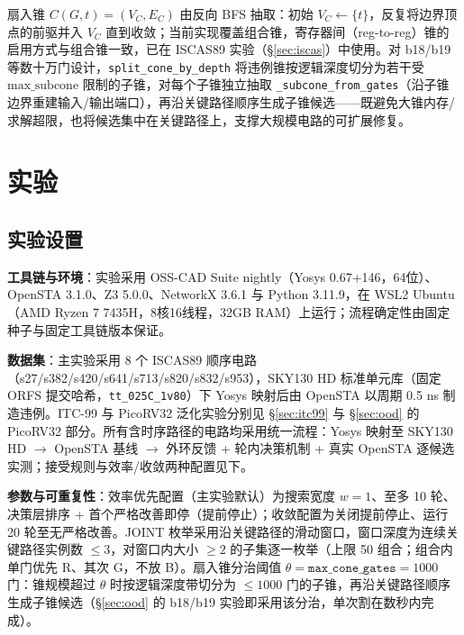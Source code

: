 \documentclass[journal]{IEEEtran}
\begin{document}
扇入锥 $C(G, t) = (V_C, E_C)$ 由反向 BFS 抽取：初始 $V_C \leftarrow \{t\}$，反复将边界顶点的前驱并入 $V_C$ 直到收敛；当前实现覆盖组合锥，寄存器间（reg-to-reg）锥的启用方式与组合锥一致，已在 ISCAS89 实验（\S\ref{sec:iscas}）中使用。对 b18/b19 等数十万门设计，\texttt{split\_cone\_by\_depth} 将违例锥按逻辑深度切分为若干受 $\mathrm{max\_subcone}$ 限制的子锥，对每个子锥独立抽取 \texttt{\_subcone\_from\_gates}（沿子锥边界重建输入/输出端口），再沿关键路径顺序生成子锥候选——既避免大锥内存/求解超限，也将候选集中在关键路径上，支撑大规模电路的可扩展修复。

\section{实验}\label{sec:exp}

\subsection{实验设置}\label{sec:setup}

\textbf{工具链与环境}：实验采用 OSS-CAD Suite nightly（Yosys 0.67+146，64位）、OpenSTA 3.1.0、Z3 5.0.0、NetworkX 3.6.1 与 Python 3.11.9，在 WSL2 Ubuntu（AMD Ryzen 7 7435H，8核16线程，32GB RAM）上运行；流程确定性由固定种子与固定工具链版本保证。

\textbf{数据集}：主实验采用 8 个 ISCAS89 顺序电路（s27/s382/s420/s641/s713/s820/s832/s953），SKY130 HD 标准单元库（固定 ORFS 提交哈希，\texttt{tt\_025C\_1v80}）下 Yosys 映射后由 OpenSTA 以周期 0.5 ns 制造违例。ITC-99 与 PicoRV32 泛化实验分别见 \S\ref{sec:itc99} 与 \S\ref{sec:ood} 的 PicoRV32 部分。所有含时序路径的电路均采用统一流程：Yosys 映射至 SKY130 HD $\rightarrow$ OpenSTA 基线 $\rightarrow$ 外环反馈 + 轮内决策机制 + 真实 OpenSTA 逐候选实测；接受规则与效率/收敛两种配置见下。

\textbf{参数与可重复性}：效率优先配置（主实验默认）为搜索宽度 $w=1$、至多 10 轮、决策层排序 + 首个严格改善即停（提前停止）；收敛配置为关闭提前停止、运行 20 轮至无严格改善。JOINT 枚举采用沿关键路径的滑动窗口，窗口深度为连续关键路径实例数 $\le 3$，对窗口内大小 $\ge 2$ 的子集逐一枚举（上限 50 组合；组合内单门优先 R、其次 G，不放 B）。扇入锥分治阈值 $\theta = \texttt{max\_cone\_gates} = 1000$ 门：锥规模超过 $\theta$ 时按逻辑深度带切分为 $\le 1000$ 门的子锥，再沿关键路径顺序生成子锥候选（\S\ref{sec:ood} 的 b18/b19 实验即采用该分治，单次割在数秒内完成）。
\end{document}

